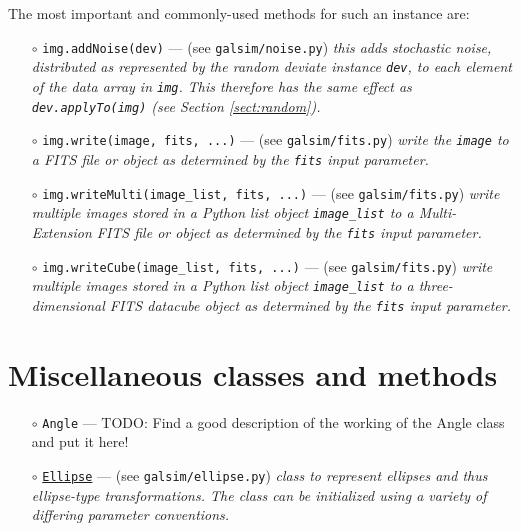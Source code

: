 \documentclass[preprint,11pt]{aastex}
\begin{document}
The most important and commonly-used methods for such an
instance are:
\begin{itemize}

\item[$\circ$] \texttt{img.addNoise(dev)} --- (see
  \texttt{galsim/noise.py}) \emph{this adds stochastic noise, distributed as
  represented by the random deviate instance \texttt{dev}, to each
  element of the data array in \texttt{img}.  This therefore has the same
  effect as \texttt{dev.applyTo(img)} (see Section \ref{sect:random}).}

\item[$\circ$] \texttt{img.write(image, fits, ...)}  ---  (see
  \texttt{galsim/fits.py}) \emph{write the \texttt{image} to a FITS
    file or object as determined by the \texttt{fits} input parameter.}

\item[$\circ$] \texttt{img.writeMulti(image\_list, fits, ...)} ---   (see
  \texttt{galsim/fits.py}) \emph{write multiple images stored in a
  Python list object \texttt{image\_list} to a Multi-Extension FITS
  file or object as determined by the \texttt{fits} input parameter.}

\item[$\circ$] \texttt{img.writeCube(image\_list, fits, ...)} ---   (see
  \texttt{galsim/fits.py}) \emph{write multiple images stored in a
  Python list object \texttt{image\_list} to a three-dimensional FITS
  datacube object as determined by the \texttt{fits} input parameter.}

\end{itemize}

\section{Miscellaneous classes and methods}\label{sect:misc}

\begin{itemize}

\item[$\circ$] \texttt{Angle} --- TODO: Find a good description of the
  working of the Angle class and put it here!

\item[$\circ$] \href{http://galsim-developers.github.com/GalSim/classgalsim_1_1ellipse_1_1_ellipse.html}{\texttt{Ellipse}} --- (see \texttt{galsim/ellipse.py})
  \emph{class to represent ellipses and thus ellipse-type transformations.  
The class can be initialized using a variety of differing parameter conventions.}

\end{itemize}
\end{document}

